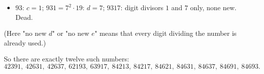 \begin{itemize}
\begin{itemize}
  \item $842=2\cdot421$: $d=1$; $8421=3\cdot7\cdot401$: $e\in\{3,7\}$, giving $\mathbf{84213}$, $\mathbf{84217}$.
  \item $846=2\cdot3^2\cdot47$: $d\in\{1,2,3,9\}$.
    $8461$: no new $e$.
    $8462=2\cdot4231$: $e=1$, giving $\mathbf{84621}$.
    $8463=3\cdot7\cdot13\cdot31$: $e\in\{1,7\}$, giving $\mathbf{84631}$, $\mathbf{84637}$.
    $8469=3^2\cdot941$: $e\in\{1,3\}$, giving $\mathbf{84691}$, $\mathbf{84693}$.
  \end{itemize}
\item $93$: $c=1$; $931=7^2\cdot19$: $d=7$; $9317$: digit divisors $1$ and $7$ only, none new. Dead.
\end{itemize}
(Here "no new $d$" or "no new $e$" means that every digit dividing the number is already used.)

So there are exactly twelve such numbers:
\[
\boxed{42391,\ 42631,\ 42637,\ 62193,\ 63917,\ 84213,\ 84217,\ 84621,\ 84631,\ 84637,\ 84691,\ 84693}.
\]
